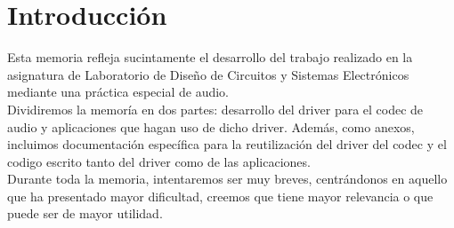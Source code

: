 \documentclass[a4paper, 12pt]{article}
\begin{document}
  

	
\newpage
\tableofcontents
\listoffigures

\newpage
\section{Introducción}
	Esta memoria refleja sucintamente el desarrollo del trabajo realizado en la asignatura de Laboratorio de Diseño de Circuitos y Sistemas Electrónicos mediante una práctica especial de audio.\\

	Dividiremos la memoría en dos partes: desarrollo del driver para el codec de audio y aplicaciones que hagan uso de dicho driver. Además, como anexos, incluimos documentación específica para la reutilización del driver del codec y el codigo escrito tanto del driver como de las aplicaciones.\\

	Durante toda la memoria, intentaremos ser muy breves, centrándonos en aquello que ha presentado mayor dificultad, creemos que tiene mayor relevancia o que puede ser de mayor utilidad.

\newpage


\newpage


\newpage


\newpage




	
\end{document}
